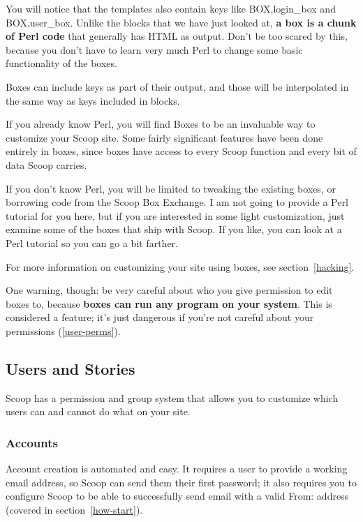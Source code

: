 You will notice that the templates also contain keys like \latexhtml{$\vert$}{|}BOX,login\_box\latexhtml{$\vert$}{|} and \latexhtml{$\vert$}{|}BOX,user\_box\latexhtml{$\vert$}{|}.  Unlike the blocks that we have just looked at, {\bf a box is a chunk of Perl code} that generally has HTML as output.  Don't be too scared by this, because you don't have to learn very much Perl to change some basic functionality of the boxes.

Boxes can include keys as part of their output, and those will be interpolated in the same way as keys included in blocks.

If you already know Perl, you will find Boxes to be an invaluable way to customize your Scoop site.  Some fairly significant features have been done entirely in boxes, since boxes have access to every Scoop function and every bit of data Scoop carries.

If you don't know Perl, you will be limited to tweaking the existing boxes, or borrowing code from the Scoop Box Exchange.  I am not going to provide a Perl tutorial for you here, but if you are interested in some light customization, just examine some of the boxes that ship with Scoop. If you like, you can look at a Perl tutorial so you can go a bit farther.

For more information on customizing your site using boxes, see section~\ref{hacking}.

One warning, though: be very careful about who you give permission to edit boxes to, because {\bf boxes can run any program on your system}.  This is considered a feature; it's just dangerous if you're not careful about your permissions (\ref{user-perms}).

\subsection{Users and Stories}
\label{admin-users}

Scoop has a permission and group system that allows you to customize which users can and cannot do what on your site.

\subsubsection{Accounts}

Account creation is automated and easy.  It requires a user to provide a working email address, so Scoop can send them their first password; it also requires you to configure Scoop to be able to successfully send email with a valid From: address (covered in section~\ref{how-start}).

